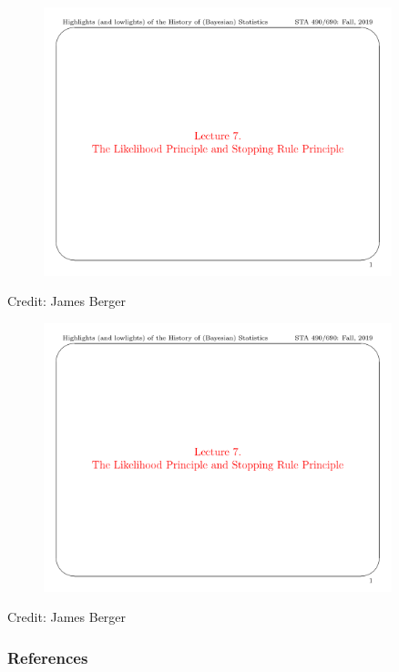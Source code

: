 \documentclass[xcolor=dvipsnames]{beamer}
\begin{document}
\begin{frame}[plain]
    \begin{figure}
        \centering
        \includegraphics[page=10, width=0.9\textwidth, trim=0 0.45in 0 0.6in, clip]{figures/History-Lecture-7.pdf}
    \end{figure}
    
\footnotesize{Credit: James Berger}
\end{frame}

\begin{frame}[plain]
    \begin{figure}
        \centering
        \includegraphics[page=11, width=0.9\textwidth, trim=0 0.45in 0 0.6in, clip]{figures/History-Lecture-7.pdf}
    \end{figure}
    
\footnotesize{Credit: James Berger}
\end{frame}

\begin{frame}[allowframebreaks]
        \frametitle{References}
        
        
\end{frame}
\end{document}
